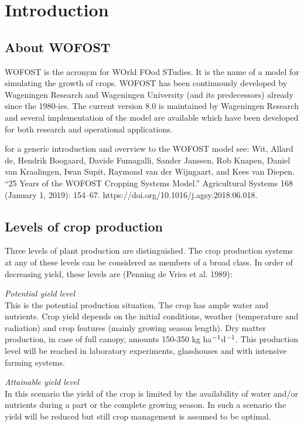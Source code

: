 
\chapter{Introduction} 

\section{About WOFOST}

WOFOST is the acronym for WOrld FOod STudies. It is the name of a model for
simulating the growth of crops. WOFOST has been continuously developed by
Wageningen Research and Wageningen University (and its predecessors) already
since the 1980-ies. The current version 8.0 is maintained by Wageningen 
Research and several implementation of the model are available which have been
developed for both research and operational applications.

for a generic introduction and overview to the WOFOST model see:
Wit, Allard de, Hendrik Boogaard, Davide Fumagalli, Sander Janssen, Rob Knapen, 
Daniel van Kraalingen, Iwan Supit, Raymond van der Wijngaart, and Kees van Diepen. 
“25 Years of the WOFOST Cropping Systems Model.” Agricultural Systems 168 
(January 1, 2019): 154–67. https://doi.org/10.1016/j.agsy.2018.06.018.

\section{Levels of crop production}
Three levels of plant
production are distinguished. The crop production systems at any of these levels can
be considered as members of a broad class. In order of decreasing yield, these levels
are (Penning de Vries et al. 1989):

{\it Potential yield level\/}\\
This is the potential production situation. The crop has ample water and nutrients.
Crop yield depends on the initial conditions, weather (temperature and radiation)
and crop features (mainly growing season length).
Dry matter production, in case of full canopy, amounts 150-350 kg ha$^{{\rm -1}}$d$^{{\rm -1}}$. This
production level will be reached in laboratory experiments, glasshouses and with
intensive farming systems.

{\it Attainable yield level\/}\\
In this scenario the yield of the crop is limited by the availability of water and/or nutrients 
during a part or the complete
growing season. In such a scenario the yield will be reduced but still crop management is assumed to be 
optimal.


